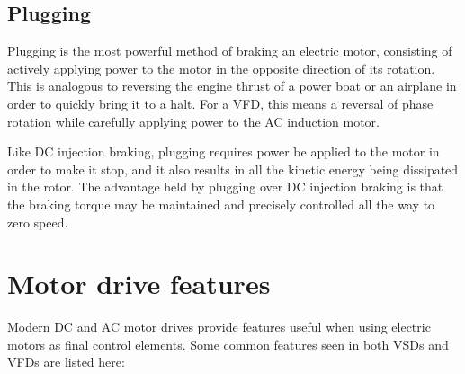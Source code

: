 \filbreak
\subsection{Plugging}

Plugging is the most powerful method of braking an electric motor, consisting of actively applying power to the motor in the opposite direction of its rotation.  This is analogous to reversing the engine thrust of a power boat or an airplane in order to quickly bring it to a halt.  For a VFD, this means a reversal of phase rotation while carefully applying power to the AC induction motor.    

Like DC injection braking, plugging requires power be applied to the motor in order to make it stop, and it also results in all the kinetic energy being dissipated in the rotor.  The advantage held by plugging over DC injection braking is that the braking torque may be maintained and precisely controlled all the way to zero speed.








\filbreak
\section{Motor drive features}

Modern DC and AC motor drives provide features useful when using electric motors as final control elements.  Some common features seen in both VSDs and VFDs are listed here:


